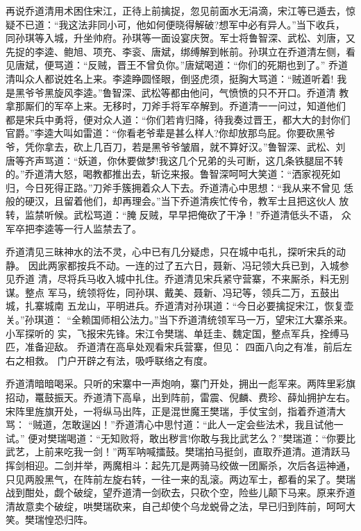 再说乔道清用术困住宋江，正待上前擒捉，忽见前面水无涓滴，宋江等已遁去，惊
疑不已道：“我这法非同小可，他如何便晓得解破?想军中必有异人。”当下收兵，
同孙琪等入城，升坐帅府。孙琪等一面设宴庆贺。军士将鲁智深、武松、刘唐，又
先捉的李逵、鲍旭、项充、李衮、唐斌，绑缚解到帐前。孙琪立在乔道清左侧，看
见唐斌，便骂道：“反贼，晋王不曾负你。”唐斌喝道：“你们的死期也到了。”
乔道清叫众人都说姓名上来。李逵睁圆怪眼，倒竖虎须，挺胸大骂道：“贼道听着!
我是黑爷爷黑旋风李逵。”鲁智深、武松等都由他问，气愤愤的只不开口。乔道清
教拿那厮们的军卒上来。无移时，刀斧手将军卒解到。乔道清一一问过，知道他们
都是宋兵中勇将，便对众人道：“你们若肯归降，待我奏过晋王，都大大的封你们
官爵。”李逵大叫如雷道：“你看老爷辈是甚么样人?你却放那鸟屁。你要砍黑爷
爷，凭你拿去，砍上几百刀，若是黑爷爷皱眉，就不算好汉。”鲁智深、武松、刘
唐等齐声骂道：“妖道，你休要做梦!我这几个兄弟的头可断，这几条铁腿屈不转
的。”乔道清大怒，喝教都推出去，斩讫来报。鲁智深呵呵大笑道：“洒家视死如
归，今日死得正路。”刀斧手簇拥着众人下去。乔道清心中思想：“我从来不曾见
恁般的硬汉，且留着他们，却再理会。”当下乔道清疾忙传令，教军士且把这伙人
放转，监禁听候。武松骂道：“腌反贼，早早把俺砍了干净！”乔道清低头不语，
众军卒把李逵等一行人监禁去了。

乔道清见三昧神水的法不灵，心中已有几分疑虑，只在城中屯扎，探听宋兵的动静。
因此两家都按兵不动。一连的过了五六日，聂新、冯玘领大兵已到，入城参见乔道
清，尽将兵马收入城中扎住。乔道清见宋兵紧守营寨，不来厮杀，料无别谋。整点
军马，统领将佐，同孙琪、戴美、聂新、冯玘等，领兵二万，五鼓出城，扎寨城南
五龙山，平明进兵。乔道清对孙琪道：“今日必要擒捉宋江，恢复壶关。”孙琪道：
“全赖国师相公法力。”当下乔道清统领军马一万，望宋江大寨杀来。小军探听的
实，飞报宋先锋。宋江令樊瑞、单廷圭、魏定国，整点军兵，拴缚马匹，准备迎敌。
乔道清在高阜处观看宋兵营寨，但见：
四面八向之有准，前后左右之相救。
门户开辟之有法，吸呼联络之有度。

乔道清暗暗喝采。只听的宋寨中一声炮响，寨门开处，拥出一彪军来。两阵里彩旗
招动，鼍鼓振天。乔道清下高阜，出到阵前，雷震、倪麟、费珍、薛灿拥护左右。
宋阵里旌旗开处，一将纵马出阵，正是混世魔王樊瑞，手仗宝剑，指着乔道清大骂：
“贼道，怎敢逞凶！”乔道清心中思忖道：“此人一定会些法术，我且试他一试。”
便对樊瑞喝道：“无知败将，敢出秽言!你敢与我比武艺么？”樊瑞道：“你要比
武艺，上前来吃我一剑！”两军呐喊擂鼓。樊瑞拍马挺剑，直取乔道清。道清跃马
挥剑相迎。二剑并举，两魔相斗：起先兀是两骑马绞做一团厮杀，次后各运神通，
只见两股黑气，在阵前左旋右转，一往一来的乱滚。两边军士，都看的呆了。樊瑞
战到酣处，觑个破绽，望乔道清一剑砍去，只砍个空，险些儿颠下马来。原来乔道
清故意卖个破绽，哄樊瑞砍来，自己却使个乌龙蜕骨之法，早已归到阵前，呵呵大
笑。樊瑞惶恐归阵。

